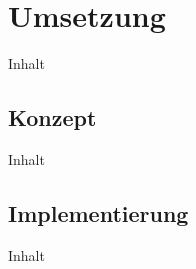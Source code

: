 \chapter{Umsetzung\label{chap3:Drittes-Kapitel}}

Inhalt

\section{Konzept\label{sec3.1:Unterpunkt-1}}

Inhalt

\section{Implementierung\label{sec3.2:Unterpunkt-2}}

Inhalt